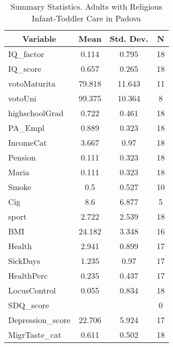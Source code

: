 
\begin{table}[htbp]\centering \caption{Summary Statistics. Adults with Religious Infant-Toddler Care in Padova \label{bothAdultasiloReliPadova}}
\begin{tabular}{l c c  c}\hline\hline
\multicolumn{1}{c}{\textbf{Variable}} & \textbf{Mean}
 & \textbf{Std. Dev.} & \textbf{N}\\ \hline
IQ\_factor & 0.114 & 0.795  & 18\\
IQ\_score & 0.657 & 0.265  & 18\\
votoMaturita & 79.818 & 11.643  & 11\\
votoUni & 99.375 & 10.364  & 8\\
highschoolGrad & 0.722 & 0.461  & 18\\
PA\_Empl & 0.889 & 0.323  & 18\\
IncomeCat & 3.667 & 0.97  & 18\\
Pension & 0.111 & 0.323  & 18\\
Maria & 0.111 & 0.323  & 18\\
Smoke & 0.5 & 0.527  & 10\\
Cig & 8.6 & 6.877  & 5\\
sport & 2.722 & 2.539  & 18\\
BMI & 24.182 & 3.348  & 16\\
Health & 2.941 & 0.899  & 17\\
SickDays & 1.235 & 0.97  & 17\\
HealthPerc & 0.235 & 0.437  & 17\\
LocusControl & 0.055 & 0.834  & 18\\
SDQ\_score &  &   & 0\\
Depression\_score & 22.706 & 5.924  & 17\\
MigrTaste\_cat & 0.611 & 0.502  & 18\\
\hline\end{tabular}
\end{table}
